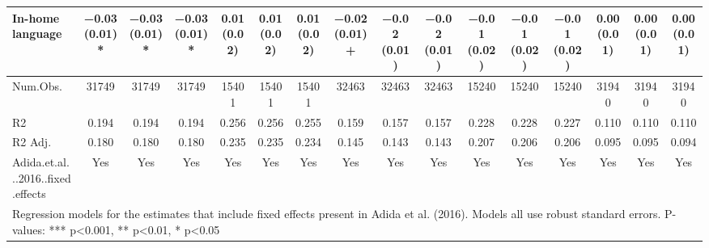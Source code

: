 \begin{table}[H]
\begin{tabular}[t]{lccccccccccccccc}
In-home language & \num{-0.03} (\num{0.01})* & \num{-0.03} (\num{0.01})* & \num{-0.03} (\num{0.01})* & \num{0.01} (\num{0.02}) & \num{0.01} (\num{0.02}) & \num{0.01} (\num{0.02}) & \num{-0.02} (\num{0.01})+ & \num{-0.02} (\num{0.01}) & \num{-0.02} (\num{0.01}) & \num{-0.01} (\num{0.02}) & \num{-0.01} (\num{0.02}) & \num{-0.01} (\num{0.02}) & \num{0.00} (\num{0.01}) & \num{0.00} (\num{0.01}) & \num{0.00} (\num{0.01})\\
\midrule
Num.Obs. & \num{31749} & \num{31749} & \num{31749} & \num{15401} & \num{15401} & \num{15401} & \num{32463} & \num{32463} & \num{32463} & \num{15240} & \num{15240} & \num{15240} & \num{31940} & \num{31940} & \num{31940}\\
R2 & \num{0.194} & \num{0.194} & \num{0.194} & \num{0.256} & \num{0.256} & \num{0.255} & \num{0.159} & \num{0.157} & \num{0.157} & \num{0.228} & \num{0.228} & \num{0.227} & \num{0.110} & \num{0.110} & \num{0.110}\\
R2 Adj. & \num{0.180} & \num{0.180} & \num{0.180} & \num{0.235} & \num{0.235} & \num{0.234} & \num{0.145} & \num{0.143} & \num{0.143} & \num{0.207} & \num{0.206} & \num{0.206} & \num{0.095} & \num{0.095} & \num{0.094}\\
Adida.et.al...2016..fixed.effects & Yes & Yes & Yes & Yes & Yes & Yes & Yes & Yes & Yes & Yes & Yes & Yes & Yes & Yes & Yes\\
\bottomrule
\multicolumn{16}{l}{\rule{0pt}{1em}Regression models for the estimates that include fixed effects present in Adida et al. (2016). Models all use robust standard errors. P-values: *** p<0.001, ** p<0.01, * p<0.05}\\
\end{tabular}
\end{table}
